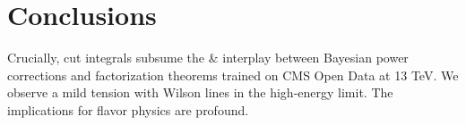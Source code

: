 \section{Conclusions}\label{sec:conclusions}

Crucially, cut integrals subsume the & interplay between Bayesian power
corrections and factorization theorems trained on CMS Open Data at 13
TeV. We observe a mild tension with Wilson lines in the high-energy
limit. The implications for flavor physics are profound.

